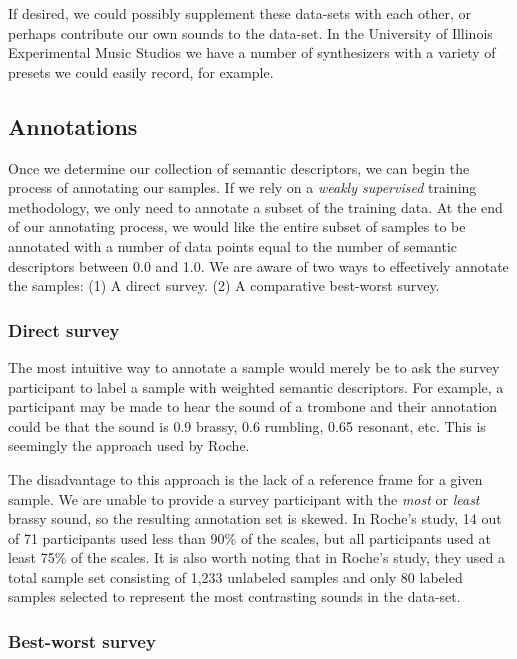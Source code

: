 \documentclass{article}
\begin{document}
If desired, we could possibly supplement these data-sets with each other, or perhaps contribute our own sounds to the data-set. In the University of Illinois Experimental Music Studios we have a number of synthesizers with a variety of presets we could easily record, for example.

\subsection{Annotations}

Once we determine our collection of semantic descriptors, we can begin the process of annotating our samples. If we rely on a \textit{weakly supervised} training methodology, we only need to annotate a subset of the training data. \cite{Zhou2017} At the end of our annotating process, we would like the entire subset of samples to be annotated with a number of data points equal to the number of semantic descriptors between 0.0 and 1.0. We are aware of two ways to effectively annotate the samples: (1) A direct survey. (2) A comparative best-worst survey.

\subsubsection{Direct survey}

The most intuitive way to annotate a sample would merely be to ask the survey participant to label a sample with weighted semantic descriptors. For example, a participant may be made to hear the sound of a trombone and their annotation could be that the sound is 0.9 brassy, 0.6 rumbling, 0.65 resonant, etc. This is seemingly the approach used by Roche. \cite{Roche2020, Roche2021}

The disadvantage to this approach is the lack of a reference frame for a given sample. We are unable to provide a survey participant with the \textit{most} or \textit{least} brassy sound, so the resulting annotation set is skewed. In Roche's study, 14 out of 71 participants used less than 90\% of the scales, but all participants used at least 75\% of the scales. It is also worth noting that in Roche's study, they used a total sample set consisting of 1,233 unlabeled samples and only 80 labeled samples selected to represent the most contrasting sounds in the data-set. \cite{Roche2020}

\subsubsection{Best-worst survey}
\end{document}
